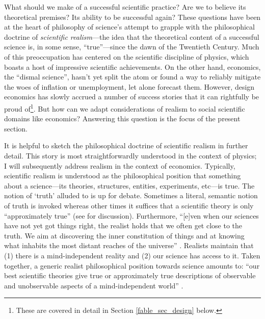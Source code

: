 
What should we make of a successful scientific practice? Are we to believe its theoretical premises? Its ability to be successful again? These questions have been at the heart of philosophy of science's attempt to grapple with the philosophical doctrine of \textit{scientific realism}---the idea that the theoretical content of a successful science is, in some sense, ``true''---since the dawn of the Twentieth Century. Much of this preoccupation has centered on the scientific discipline of physics, which boasts a host of impressive scientific achievements. On the other hand, economics, the ``dismal science'', hasn't yet split the atom or found a way to reliably mitigate the woes of inflation or unemployment, let alone forecast them. However, design economics has slowly accrued a number of success stories that it can rightfully be proud of\footnote{These are covered in detail in Section \ref{fable_sec_design} below.}. But how can we adapt considerations of realism to social scientific domains like economics? Answering this question is the focus of the present section.

It is helpful to sketch the philosophical doctrine of scientific realism in further detail. This story is most straightforwardly understood in the context of physics; I will subsequently address realism in the context of economics. Typically, scientific realism is understood as the philosophical position that something about a science---its theories, structures, entities, experiments, etc---is true. The notion of `truth' alluded to is up for debate. Sometimes a literal, semantic notion of truth is invoked whereas other times it suffices that a scientific theory is only ``approximately true'' (see \cite{chakravartty2017} for discussion). Furthermore, ``[e]ven when our sciences have not yet got things right, the realist holds that we often get close to the truth. We aim at discovering the inner constitution of things and at knowing what inhabits the most distant reaches of the universe'' \autocite[21]{hacking1983}. Realists maintain that (1) there is a mind-independent reality and (2) our science has access to it. Taken together, a generic realist philosophical position towards science amounts to: ``our best scientific theories give true or approximately true descriptions of observable and unobservable aspects of a mind-independent world'' \autocite[\S 1.2]{chakravartty2017}.

